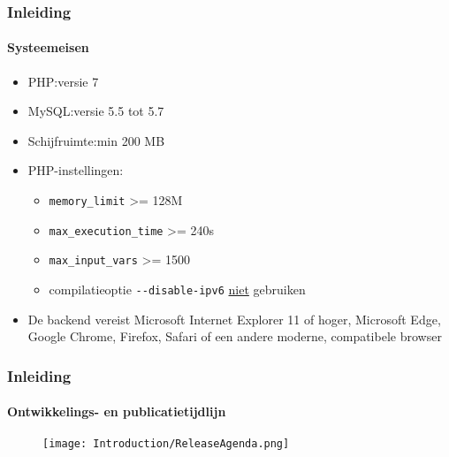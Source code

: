 \begin{frame}[fragile]
	\frametitle{Inleiding}
	\framesubtitle{Systeemeisen}

	\begin{itemize}
		\item PHP:\tabto{2.2cm}versie 7
		\item MySQL:\tabto{2.2cm}versie 5.5 tot 5.7
		\item Schijfruimte:\tabto{2.2cm}min 200 MB
		\item PHP-instellingen:

			\begin{itemize}
				\item \texttt{memory\_limit} >= 128M
				\item \texttt{max\_execution\_time} >= 240s
				\item \texttt{max\_input\_vars} >= 1500
				\item compilatieoptie \texttt{-}\texttt{-disable-ipv6} \underline{niet} gebruiken
			\end{itemize}

		\item De backend vereist Microsoft Internet Explorer 11 of hoger,\newline
			Microsoft Edge, Google Chrome, Firefox, Safari\newline
			of een andere moderne, compatibele browser

	\end{itemize}

\end{frame}

\begin{frame}[fragile]
	\frametitle{Inleiding}
	\framesubtitle{Ontwikkelings- en publicatietijdlijn}

	\begin{figure}
		\texttt{[image: Introduction/ReleaseAgenda.png]}
	\end{figure}

\end{frame}

